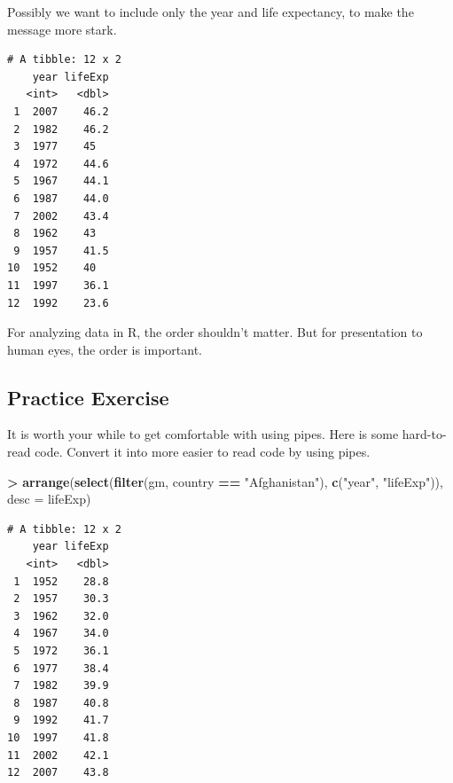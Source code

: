 \documentclass[]{krantz}
\makeatletter
\newenvironment{Shaded}{\begin{snugshade}}{\end{snugshade}}
\newcommand{\KeywordTok}[1]{\textcolor[rgb]{0.27,0.27,0.27}{\textbf{#1}}}
\newcommand{\DataTypeTok}[1]{\textcolor[rgb]{0.27,0.27,0.27}{#1}}
\newcommand{\StringTok}[1]{\textcolor[rgb]{0.5,0.5,0.5}{#1}}
\newcommand{\OperatorTok}[1]{\textcolor[rgb]{0.43,0.43,0.43}{\textbf{#1}}}
\newcommand{\NormalTok}[1]{#1}
\newenvironment{kframe}{%
\medskip{}
\setlength{\fboxsep}{.8em}
 \def\at@end@of@kframe{}%
 \ifinner\ifhmode%
  \def\at@end@of@kframe{\end{minipage}}%
  \begin{minipage}{\columnwidth}%
 \fi\fi%
 \def\FrameCommand##1{\hskip\@totalleftmargin \hskip-\fboxsep
 \colorbox{shadecolor}{##1}\hskip-\fboxsep
     \hskip-\linewidth \hskip-\@totalleftmargin \hskip\columnwidth}%
 \MakeFramed {\advance\hsize-\width
   \@totalleftmargin\z@ \linewidth\hsize
   \@setminipage}}%
 {\par\unskip\endMakeFramed%
 \at@end@of@kframe}
\renewenvironment{Shaded}{\begin{kframe}}{\end{kframe}}
\makeatother
\begin{document}
Possibly we want to include only the year and life expectancy, to make
the message more stark.

\begin{Shaded}
\end{Shaded}

\begin{verbatim}
# A tibble: 12 x 2
    year lifeExp
   <int>   <dbl>
 1  2007    46.2
 2  1982    46.2
 3  1977    45  
 4  1972    44.6
 5  1967    44.1
 6  1987    44.0
 7  2002    43.4
 8  1962    43  
 9  1957    41.5
10  1952    40  
11  1997    36.1
12  1992    23.6
\end{verbatim}

For analyzing data in R, the order shouldn't matter. But for
presentation to human eyes, the order is important.

\subsection{Practice Exercise}\label{practice-exercise-9}

It is worth your while to get comfortable with using pipes. Here is some
hard-to-read code. Convert it into more easier to read code by using
pipes.

\begin{Shaded}
\begin{Highlighting}[]
\OperatorTok{>}\StringTok{ }\KeywordTok{arrange}\NormalTok{(}\KeywordTok{select}\NormalTok{(}\KeywordTok{filter}\NormalTok{(gm, country }\OperatorTok{==}\StringTok{ "Afghanistan"}\NormalTok{), }\KeywordTok{c}\NormalTok{(}\StringTok{"year"}\NormalTok{, }\StringTok{"lifeExp"}\NormalTok{)), }\DataTypeTok{desc =}\NormalTok{ lifeExp)}
\end{Highlighting}
\end{Shaded}

\begin{verbatim}
# A tibble: 12 x 2
    year lifeExp
   <int>   <dbl>
 1  1952    28.8
 2  1957    30.3
 3  1962    32.0
 4  1967    34.0
 5  1972    36.1
 6  1977    38.4
 7  1982    39.9
 8  1987    40.8
 9  1992    41.7
10  1997    41.8
11  2002    42.1
12  2007    43.8
\end{verbatim}
\end{document}

